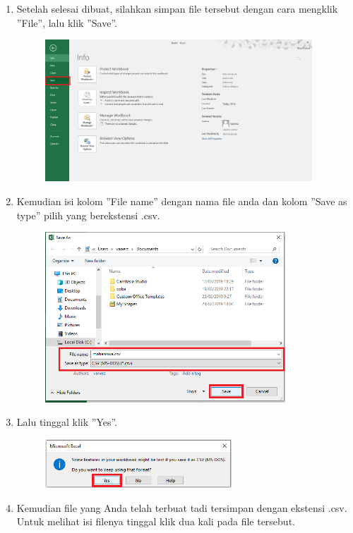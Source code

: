 \begin{enumerate}
	\item Setelah selesai dibuat, silahkan simpan file tersebut dengan cara mengklik ''File'', lalu klik ''Save''.
	
	\begin{figure}[H]
		\includegraphics[width=10cm]{figures/4/1174089/Teori/t4.png}
		\centering
	\end{figure}
	
	\item Kemudian isi kolom ''File name'' dengan nama file anda dan kolom ''Save as type'' pilih yang berekstensi .csv.
	
	\begin{figure}[H]
		\includegraphics[width=9cm]{figures/4/1174089/Teori/t5.png}
		\centering
	\end{figure}
	
	\item Lalu tinggal klik ''Yes''.
	
	\begin{figure}[H]
		\includegraphics[width=7cm]{figures/4/1174089/Teori/t6.png}
		\centering
	\end{figure}
	
	\item Kemudian file yang Anda telah terbuat tadi tersimpan dengan ekstensi .csv. Untuk melihat isi filenya tinggal klik dua kali pada file tersebut.
	

\end{enumerate}
